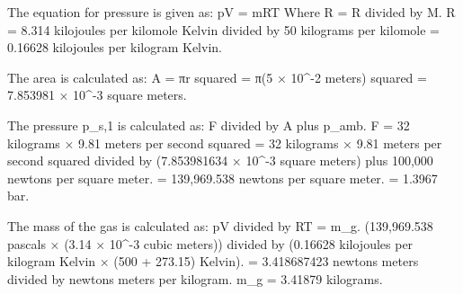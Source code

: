 The equation for pressure is given as:  
pV = mRT  
Where R = R divided by M.  
R = 8.314 kilojoules per kilomole Kelvin divided by 50 kilograms per kilomole = 0.16628 kilojoules per kilogram Kelvin.  

The area is calculated as:  
A = πr squared = π(5 × 10^-2 meters) squared = 7.853981 × 10^-3 square meters.  

The pressure p_s,1 is calculated as:  
F divided by A plus p_amb.  
F = 32 kilograms × 9.81 meters per second squared = 32 kilograms × 9.81 meters per second squared divided by (7.853981634 × 10^-3 square meters) plus 100,000 newtons per square meter.  
= 139,969.538 newtons per square meter.  
= 1.3967 bar.  

The mass of the gas is calculated as:  
pV divided by RT = m_g.  
(139,969.538 pascals × (3.14 × 10^-3 cubic meters)) divided by (0.16628 kilojoules per kilogram Kelvin × (500 + 273.15) Kelvin).  
= 3.418687423 newtons meters divided by newtons meters per kilogram.  
m_g = 3.41879 kilograms.